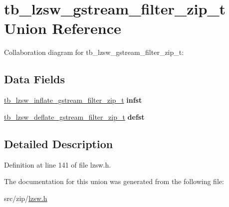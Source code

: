 \hypertarget{uniontb__lzsw__gstream__filter__zip__t}{\section{tb\-\_\-lzsw\-\_\-gstream\-\_\-filter\-\_\-zip\-\_\-t Union Reference}
\label{uniontb__lzsw__gstream__filter__zip__t}
}


Collaboration diagram for tb\-\_\-lzsw\-\_\-gstream\-\_\-filter\-\_\-zip\-\_\-t\-:
\subsection*{Data Fields}
\begin{DoxyCompactItemize}
\item 
\hypertarget{uniontb__lzsw__gstream__filter__zip__t_a7e6866e19d907e8b8579cf818557b7c3}{\hyperlink{structtb__lzsw__inflate__gstream__filter__zip__t}{tb\-\_\-lzsw\-\_\-inflate\-\_\-gstream\-\_\-filter\-\_\-zip\-\_\-t} {\bfseries infst}}\label{uniontb__lzsw__gstream__filter__zip__t_a7e6866e19d907e8b8579cf818557b7c3}

\item 
\hypertarget{uniontb__lzsw__gstream__filter__zip__t_a0c74065a5f638a0dcdbd80cf63ea5493}{\hyperlink{structtb__lzsw__deflate__gstream__filter__zip__t}{tb\-\_\-lzsw\-\_\-deflate\-\_\-gstream\-\_\-filter\-\_\-zip\-\_\-t} {\bfseries defst}}\label{uniontb__lzsw__gstream__filter__zip__t_a0c74065a5f638a0dcdbd80cf63ea5493}

\end{DoxyCompactItemize}


\subsection{Detailed Description}


Definition at line 141 of file lzsw.\-h.



The documentation for this union was generated from the following file\-:\begin{DoxyCompactItemize}
\item 
src/zip/\hyperlink{lzsw_8h}{lzsw.\-h}\end{DoxyCompactItemize}
